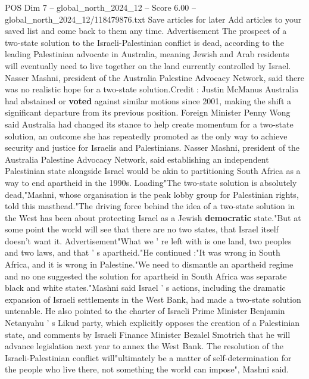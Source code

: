 \begin{textsample}{POS Dim 7 – global\_north\_2024\_12 – Score 6.00 – global\_north\_2024\_12/118479876.txt}  \label{ex:f7_pos_293}
Save articles for later Add articles to your saved list and come back to them any time.
Advertisement The prospect of a two-state solution to the Israeli-Palestinian conflict is dead, according to the leading Palestinian advocate in Australia, meaning Jewish and Arab residents will eventually need to live together on the land currently controlled by Israel.
Nasser Mashni, president of the Australia Palestine Advocacy Network, said there was no realistic hope for a two-state solution.Credit : Justin McManus Australia had abstained or \textbf{voted} against similar motions since 2001, making the shift a significant departure from its previous position.
Foreign Minister Penny Wong said Australia had changed its stance to help create momentum for a two-state solution, an outcome she has repeatedly promoted as the only way to achieve security and justice for Israelis and Palestinians.
Nasser Mashni, president of the Australia Palestine Advocacy Network, said establishing an independent Palestinian state alongside Israel would be akin to partitioning South Africa as a way to end apartheid in the 1990s.
Loading"The two-state solution is absolutely dead,"Mashni, whose organisation is the peak lobby group for Palestinian rights, told this masthead."The driving force behind the idea of a two-state solution in the West has been about protecting Israel as a Jewish \textbf{democratic} state."But at some point the world will see that there are no two states, that Israel itself doesn't want it.
Advertisement"What we ' re left with is one land, two peoples and two laws, and that ' s apartheid."He continued :"It was wrong in South Africa, and it is wrong in Palestine."We need to dismantle an apartheid regime and no one suggested the solution for apartheid in South Africa was separate black and white states."Mashni said Israel ' s actions, including the dramatic expansion of Israeli settlements in the West Bank, had made a two-state solution untenable.
He also pointed to the charter of Israeli Prime Minister Benjamin Netanyahu ' s Likud party, which explicitly opposes the creation of a Palestinian state, and comments by Israeli Finance Minister Bezalel Smotrich that he will advance legislation next year to annex the West Bank.
The resolution of the Israeli-Palestinian conflict will"ultimately be a matter of self-determination for the people who live there, not something the world can impose", Mashni said.

\end{textsample}
